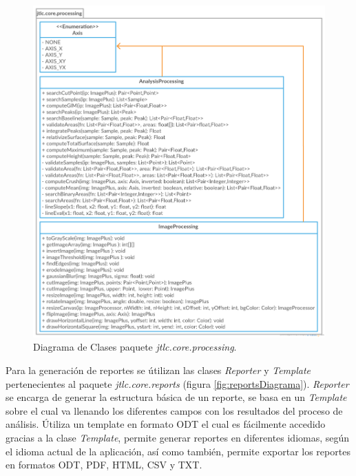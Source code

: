 \begin{figure}[H]
	\centering
	\vspace{-0.5cm}
	\includegraphics[width=425pt]{imagenes-jtlc/processing}
	\centering
	\vspace{-0.5cm}
	\caption{Diagrama de Clases paquete \textit{jtlc.core.processing}.}
	\label{fig:processingDiagrama}
\end{figure}

\newpage
Para la generaci\'on de reportes se \'utilizan las clases \textit{Reporter} y \textit{Template} pertenecientes al paquete \textit{jtlc.core.reports} (figura \ref{fig:reportsDiagrama}). \textit{Reporter} se encarga de generar la estructura b\'asica de un reporte, se basa en un \textit{Template} sobre el cual va llenando los diferentes campos con los resultados del proceso de an\'alisis.
\'Utiliza un template en formato ODT el cual es f\'acilmente accedido gracias a la clase \textit{Template}, permite generar reportes en diferentes idiomas, seg\'un el idioma actual de la aplicaci\'on, as\'i como tambi\'en, permite exportar los reportes en formatos ODT, PDF, HTML, CSV y TXT.

